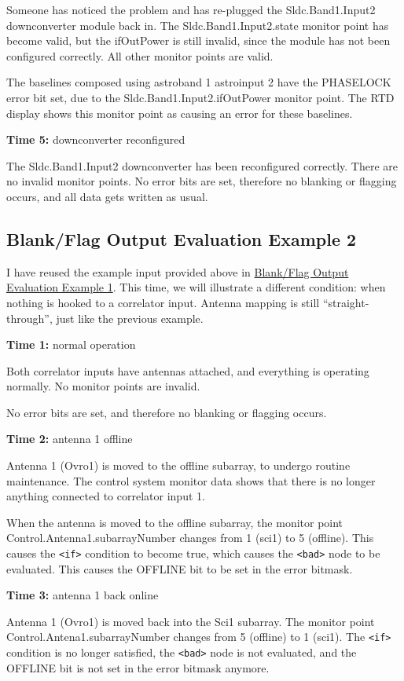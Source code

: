 \documentclass[letterpaper,12pt,oneside,pdftex]{article}
\newcommand{\mytime}[2]{\textbf{Time #1:} #2}
\begin{document}
Someone has noticed the problem and has re-plugged the Sldc.Band1.Input2
downconverter module back in. The Sldc.Band1.Input2.state monitor point has
become valid, but the ifOutPower is still invalid, since the module has not been
configured correctly. All other monitor points are valid.

The baselines composed using astroband 1 astroinput 2 have the PHASELOCK error
bit set, due to the Sldc.Band1.Input2.ifOutPower monitor point. The RTD display
shows this monitor point as causing an error for these baselines.

\mytime{5}{downconverter reconfigured}

The Sldc.Band1.Input2 downconverter has been reconfigured correctly. There are
no invalid monitor points. No error bits are set, therefore no blanking or
flagging occurs, and all data gets written as usual.

\subsection{Blank/Flag Output Evaluation Example 2}

I have reused the example input provided above in
\hyperref[bfoutput-example1]{Blank/Flag Output Evaluation Example 1}. This time,
we will illustrate a different condition: when nothing is hooked to a correlator
input. Antenna mapping is still ``straight-through'', just like the previous
example.

\mytime{1}{normal operation}

Both correlator inputs have antennas attached, and everything is operating
normally. No monitor points are invalid.

No error bits are set, and therefore no blanking or flagging occurs.

\mytime{2}{antenna 1 offline}

Antenna 1 (Ovro1) is moved to the offline subarray, to undergo routine
maintenance. The control system monitor data shows that there is no longer
anything connected to correlator input 1.

When the antenna is moved to the offline subarray, the monitor point
Control.Antenna1.subarrayNumber changes from 1 (sci1) to 5 (offline). This
causes the \verb|<if>| condition to become true, which causes the \verb|<bad>|
node to be evaluated. This causes the OFFLINE bit to be set in the error
bitmask.

\mytime{3}{antenna 1 back online}

Antenna 1 (Ovro1) is moved back into the Sci1 subarray. The monitor point
Control.Antena1.subarrayNumber changes from 5 (offline) to 1 (sci1). The
\verb|<if>| condition is no longer satisfied, the \verb|<bad>| node is not
evaluated, and the OFFLINE bit is not set in the error bitmask anymore.
\end{document}
